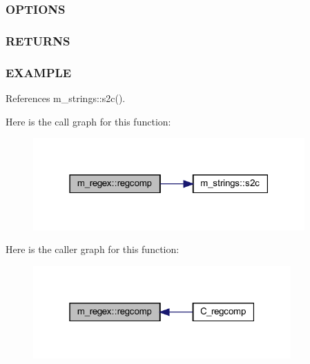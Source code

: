 \subsubsection*{O\+P\+T\+I\+O\+NS}

\subsubsection*{R\+E\+T\+U\+R\+NS}

\subsubsection*{E\+X\+A\+M\+P\+LE}

References m\+\_\+strings\+::s2c().

Here is the call graph for this function\+:
\nopagebreak
\begin{figure}[H]
\begin{center}
\leavevmode
\includegraphics[width=295pt]{namespacem__regex_ac4e468cb031565f4f4744d8f4c9eee91_cgraph}
\end{center}
\end{figure}
Here is the caller graph for this function\+:
\nopagebreak
\begin{figure}[H]
\begin{center}
\leavevmode
\includegraphics[width=280pt]{namespacem__regex_ac4e468cb031565f4f4744d8f4c9eee91_icgraph}
\end{center}
\end{figure}
\mbox{\label{namespacem__regex_a7fe6dc1737cbfdf0bb8e1ddca2055a33}} 
